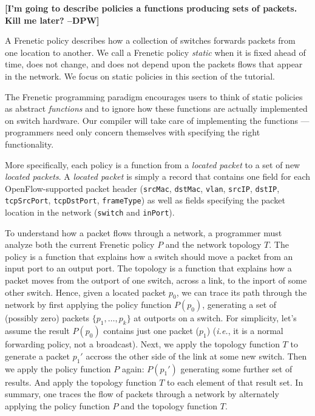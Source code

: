 \documentclass{article}
\newcommand{\finish}[2][cornellred]{\ifdraft\textcolor{#1}{\textbf{[#2]}}\fi}
\newcommand{\dpw}[1]{\finish[cornellred]{#1 --DPW}}
\newcommand{\code}[1]{\texttt{#1}}
\newcommand{\ie}{\emph{i.e.}}
\begin{document}
\dpw{I'm going to describe policies a functions producing sets of packets.
Kill me later?}

A Frenetic policy describes how a collection of switches
forwards packets from one location to another.  We call a Frenetic policy
\emph{static} when it is fixed ahead of time,
does not change, and does not depend upon the packets flows that
appear in the network.  We focus on static policies in this
section of the tutorial.

The Frenetic programming paradigm encourages users to think of static
policies as abstract \emph{functions} and to ignore how these functions
are actually implemented on switch hardware.  Our compiler will take
care of implementing the functions --- programmers need only concern
themselves with specifying the right functionality.  

More specifically, each policy is a function
from a \emph{located packet} to a set of new \emph{located packets}.
A \emph{located packet} is simply a record that contains one
field for each OpenFlow-supported packet header (\code{srcMac}, \code{dstMac},
\code{vlan}, \code{srcIP}, \code{dstIP}, \code{tcpSrcPort}, \code{tcpDstPort}, 
\code{frameType}) as well as fields specifying the packet location 
in the network (\code{switch} and \code{inPort}).

To understand how a packet flows through a network, a programmer must
analyze both the current Frenetic policy $P$ and the network topology
$T$.  The policy is a function that explains how a switch should move
a packet from an input port to an output port.  The topology is a
function that explains how a packet moves from the outport of one
switch, across a link, to the inport of some other switch.  Hence,
given a located packet $p_0$, we can trace its path through the
network by first applying the policy function $P(p_0)$, generating a
set of (possibly zero) packets $\{p_1,\ldots,p_k\}$ at outports on a
switch.  For simplicity, let's assume the result $P(p_0)$ contains
just one packet ($p_1$) (\ie, it is a normal forwarding policy, not a
broadcast).  Next, we apply the topology function $T$ to generate a
packet $p_1'$ accross the other side of the link at some new switch.
Then we apply the policy function $P$ again: $P(p_1')$ generating some
further set of results.  And apply the topology function $T$ to each
element of that result set.  In summary, one traces the flow of
packets through a network by alternately applying the policy function
$P$ and the topology function $T$.
\end{document}
